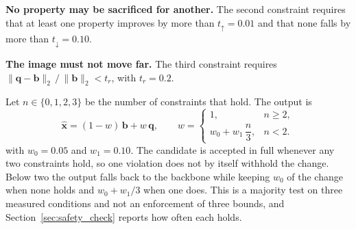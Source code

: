 \textbf{No property may be sacrificed for another.} The second constraint requires that at least one
property improves by more than $t_{\uparrow} = 0.01$ and that none falls by more than
$t_{\downarrow} = 0.10$.

\textbf{The image must not move far.} The third constraint requires
$\lVert \mathbf{q} - \mathbf{b} \rVert_2 \,/\, \lVert \mathbf{b} \rVert_2 < t_r$, with
$t_r = 0.2$.

Let $n \in \{0,1,2,3\}$ be the number of constraints that hold. The output is
\begin{equation}
\hat{\mathbf{x}} = (1 - w)\,\mathbf{b} + w\,\mathbf{q},
\qquad
w = \begin{cases}
1, & n \ge 2, \\[2pt]
w_0 + w_1\,\dfrac{n}{3}, & n < 2 .
\end{cases}
\label{eq:blend}
\end{equation}
with $w_0 = 0.05$ and $w_1 = 0.10$. The candidate is accepted in full whenever any two constraints
hold, so one violation does not by itself withhold the change. Below two the output falls back to the
backbone while keeping $w_0$ of the change when none holds and $w_0 + w_1/3$ when one does. This is a majority test on three
measured conditions and not an enforcement of three bounds, and Section~\ref{sec:safety_check}
reports how often each holds.



